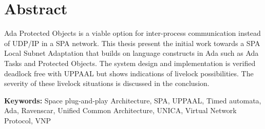 \chapter*{Abstract}
\thispagestyle{empty} %
Ada Protected Objects is a viable option for inter-process communication
instead of UDP/IP in a SPA network. This thesis present the initial work
towards a SPA Local Subnet Adaptation that builds on language constructs in Ada
such as Ada Tasks and Protected Objects. The system design and implementation
is verified deadlock free with UPPAAL but shows indications of livelock
possibilities. The severity of these livelock situations is discussed in the
conclusion.

\textbf{Keywords:} Space plug-and-play Architecture, SPA, UPPAAL, Timed
automata, Ada, Ravenscar, Unified Common Architecture, UNICA, Virtual Network
Protocol, VNP
